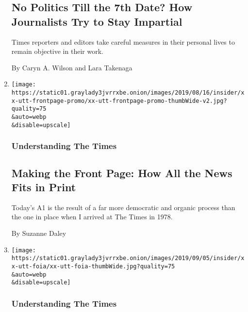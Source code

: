 \begin{enumerate}
{  \subsection{No Politics Till the 7th Date? How Journalists Try to Stay
  Impartial}\label{no-politics-till-the-7th-date-how-journalists-try-to-stay-impartial}}

  Times reporters and editors take careful measures in their personal
  lives to remain objective in their work.

  By Caryn A. Wilson and Lara Takenaga
\item
  \href{/2019/12/23/reader-center/front-page-headlines.html}{}

  \texttt{[image: https://static01.graylady3jvrrxbe.onion/images/2019/08/16/insider/xx-utt-frontpage-promo/xx-utt-frontpage-promo-thumbWide-v2.jpg?quality=75\\\&auto=webp\\\&disable=upscale]}

  \hypertarget{understanding-the-times-4}{%
  \subsubsection{Understanding The
  Times}\label{understanding-the-times-4}}

  \hypertarget{making-the-front-page-how-all-the-news-fits-in-print}{%
  \subsection{Making the Front Page: How All the News Fits in
  Print}\label{making-the-front-page-how-all-the-news-fits-in-print}}

  Today's A1 is the result of a far more democratic and organic process
  than the one in place when I arrived at The Times in 1978.

  By Suzanne Daley
\item
  \href{/2019/09/02/reader-center/foia-freedom-of-information-public-records.html}{}

  \texttt{[image: https://static01.graylady3jvrrxbe.onion/images/2019/09/05/insider/xx-utt-foia/xx-utt-foia-thumbWide.jpg?quality=75\\\&auto=webp\\\&disable=upscale]}

  \hypertarget{understanding-the-times-5}{%
  \subsubsection{Understanding The
  Times}\label{understanding-the-times-5}}

  \hypertarget{how-the-times-uses-foia-to-obtain-information-the-public-has-a-right-to-know}{%
}
\end{enumerate}
